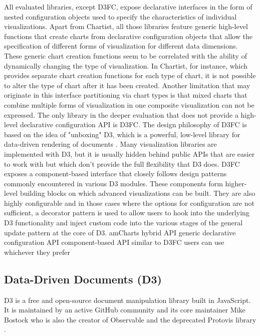 All evaluated libraries, except D3FC, expose declarative interfaces in the form of nested configuration objects used to specify the characteristics of individual visualizations. Apart from Chartist, all those libraries feature generic high-level functions that create charts from declarative configuration objects that allow the specification of different forms of visualization for different data dimensions. These generic chart creation functions seem to be correlated with the ability of dynamically changing the type of visualization. In Chartist, for instance, which provides separate chart creation functions for each type of chart, it is not possible to alter the type of chart after it has been created. Another limitation that may originate in this interface partitioning via chart types is that mixed charts that combine multiple forms of visualization in one composite visualization can not be expressed. The only library in the deeper evaluation that does not provide a high-level declarative configuration API is D3FC. The design philosophy of D3FC is based on the idea of "unboxing" D3, which is a powerful, low-level library for data-driven rendering of documents \parencite{D3}. Many visualization libraries are implemented with D3, but it is usually hidden behind public APIs that are easier to work with but which don't provide the full flexibility that D3 does. D3FC exposes a component-based interface that closely follows design patterns commonly encountered in various D3 modules. These components form higher-level building blocks on which advanced visualizations can be built. They are also highly configurable and in those cases where the options for configuration are not sufficient, a decorator pattern is used to allow users to hook into the underlying D3 functionality and inject custom code into the various stages of the general update pattern at the core of D3. 
amCharts
hybrid API
generic declarative configuration API
component-based API similar to D3FC
users can use whichever they prefer 

\subsection{Data-Driven Documents (D3)}

D3 \parencite{D3} is a free and open-source document manipulation library built in JavaScript. It is maintained by an active GitHub community and its core maintainer Mike Bostock who is also the creator of Observable \parencite{Observable} and the deprecated Protovis library \parencite{Protovis}. 

